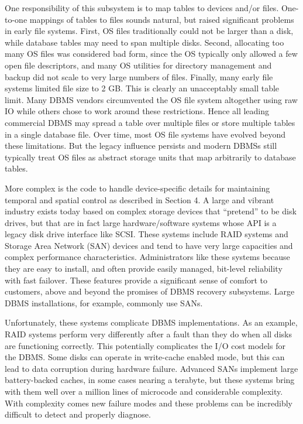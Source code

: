 \documentclass[a4paper,11pt,twoside,openright]{book}
\begin{document}
One responsibility of this subsystem is to map tables to devices and/or
files. One-to-one mappings of tables to files sounds natural, but raised
significant problems in early file systems. First, OS files
traditionally could not be larger than a disk, while database tables may
need to span multiple disks. Second, allocating too many OS files was
considered bad form, since the OS typically only allowed a few open file
descriptors, and many OS utilities for directory management and backup
did not scale to very large numbers of files. Finally, many early file
systems limited file size to 2 GB. This is clearly an unacceptably small
table limit. Many DBMS vendors circumvented the OS file system
altogether using raw IO while others chose to work around these
restrictions. Hence all leading commercial DBMS may spread a table over
multiple files or store multiple tables in a single database file. Over
time, most OS file systems have evolved beyond these limitations. But
the legacy influence persists and modern DBMSs still typically treat OS
files as abstract storage units that map arbitrarily to database tables.

More complex is the code to handle device-specific details for
maintaining temporal and spatial control as described in Section 4. A
large and vibrant industry exists today based on complex storage devices
that ``pretend'' to be disk drives, but that are in fact large
hardware/software systems whose API is a legacy disk drive interface
like SCSI. These systems include RAID systems and Storage Area Network
(SAN) devices and tend to have very large capacities and complex
performance characteristics. Administrators like these systems because
they are easy to install, and often provide easily managed, bit-level
reliability with fast failover. These features provide a significant
sense of comfort to customers, above and beyond the promises of DBMS
recovery subsystems. Large DBMS installations, for example, commonly use
SANs.

Unfortunately, these systems complicate DBMS implementations. As an
example, RAID systems perform very differently after a fault than they
do when all disks are functioning correctly. This potentially
complicates the I/O cost models for the DBMS. Some disks can operate in
write-cache enabled mode, but this can lead to data corruption during
hardware failure. Advanced SANs implement large battery-backed caches,
in some cases nearing a terabyte, but these systems bring with them well
over a million lines of microcode and considerable complexity. With
complexity comes new failure modes and these problems can be incredibly
difficult to detect and properly diagnose.
\end{document}
